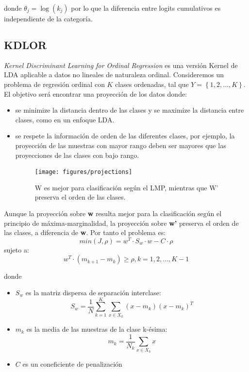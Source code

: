 donde $\theta_j=\log(k_j)$ por lo que la diferencia entre logits cumulativos es independiente de la categoría.

\subsection{KDLOR}
\textit{Kernel Discriminant Learning for Ordinal Regression}  \cite{sun2010kernel} es una versión Kernel de LDA aplicable a datos no lineales de naturaleza ordinal. \newline
Consideremos un problema de regresión ordinal con $K$ clases ordenadas, tal que $Y= \left\{ 1,2,...,K \right\}$. El objetivo será encontrar una proyección de los datos donde:
\begin{itemize}
	\item se minimize la distancia dentro de las clases y se maximize la distancia entre clases, como en un enfoque LDA.
	\item se respete la información de orden de las diferentes clases, por ejemplo, la proyección de las muestras con mayor rango deben ser mayores que las proyecciones de las clases con bajo rango.
	
	\begin{figure}[H]
		\centering
		\texttt{[image: figures/projections]}
		\caption[Short figure name.]{W es mejor para clasificación según el LMP, mientras que W' preserva el orden de las clases.
			\label{fig:myInlineFigure}}
	\end{figure}
\end{itemize}
	Aunque la proyección sobre \textbf{w} resulta mejor para la clasificación según el principio de máxima-marginalidad, la proyección sobre \textbf{w'} preserva el orden de las clases, a diferencia de \textbf{w}. Por tanto el problema es: 
	$$min(J, \rho)=w^T \cdot S_w \cdot w -C \cdot \rho$$ sujeto a:
	$$w^T \cdot (m_{k+1}-m_k) \geq \rho, k=1,2,...,K-1$$
	
	donde 
	\begin{itemize}
	\item $S_w$ es la matriz dispersa de separación interclase: $$S_w=\frac{1}{N} \sum_{k=1}^{K} \sum_{x \in X_k}(x-m_k)(x-m_k)^T$$
	\item $m_k$ es la media de las muestras de la clase k-ésima:
	$$m_k=\frac{1}{N_k}\sum_{x \in X_k}x$$
	\item $C$ es un coneficiente de penalización
	\end{itemize}

